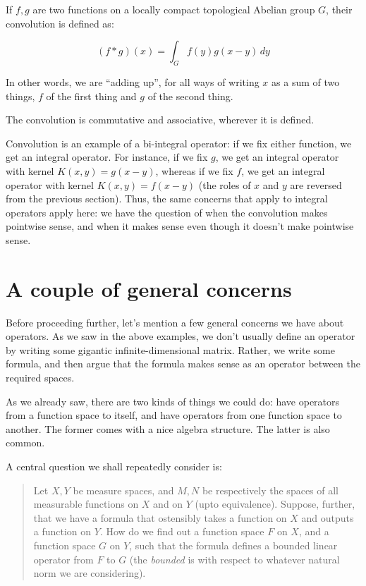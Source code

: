 \documentclass[a4paper]{amsart}
\begin{document}
If $f,g$ are two functions on a locally compact topological Abelian
group $G$, their convolution is defined as:

$$(f * g)(x) = \int_G f(y)g(x - y) \, dy$$

In other words, we are ``adding up'', for all ways of writing $x$ as a
sum of two things, $f$ of the first thing and $g$ of the second thing.

The convolution is commutative and associative, wherever it is defined.

Convolution is an example of a bi-integral operator: if we fix either
function, we get an integral operator. For instance, if
we fix $g$, we get an integral operator with kernel $K(x,y) = g(x-y)$,
whereas if we fix $f$, we get an integral operator with kernel $K(x,y)
= f(x-y)$ (the roles of $x$ and $y$ are reversed from the previous
section). Thus, the same concerns that apply to integral operators
apply here: we have the question of when the convolution makes
pointwise sense, and when it makes sense even though it doesn't make
pointwise sense.

\section{A couple of general concerns}

Before proceeding further, let's mention a few general concerns we
have about operators. As we saw in the above examples, we don't
usually define an operator by writing some gigantic
infinite-dimensional matrix. Rather, we write some formula, and then
argue that the formula makes sense as an operator between the required
spaces.

As we already saw, there are two kinds of things we could do: have
operators from a function space to itself, and have operators from one
function space to another. The former comes with a nice algebra
structure. The latter is also common.

A central question we shall repeatedly consider is:

\begin{quote}
  Let $X,Y$ be measure spaces, and $M,N$ be respectively the spaces of
  all measurable functions on $X$ and on $Y$ (upto
  equivalence). Suppose, further, that we have a formula that
  ostensibly takes a function on $X$ and outputs a function on
  $Y$. How do we find out a function space $F$ on $X$, and a function
  space $G$ on $Y$, such that the formula defines a bounded linear
  operator from $F$ to $G$ (the {\em bounded} is with respect to
  whatever natural norm we are considering).
\end{quote}
\end{document}

